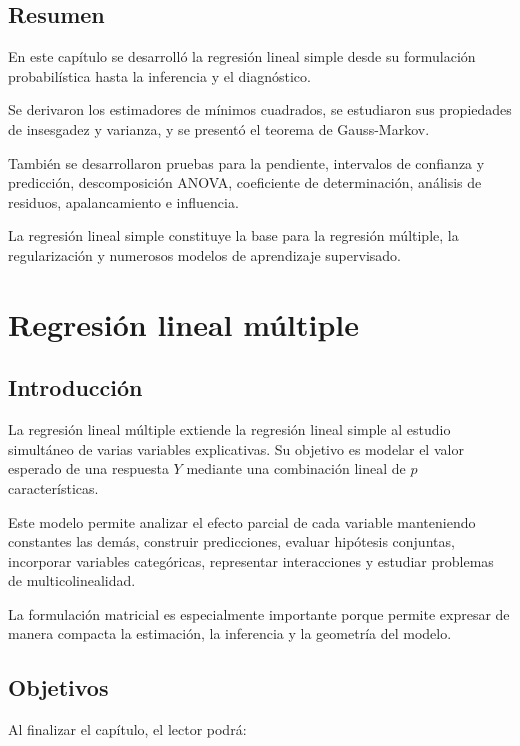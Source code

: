 \documentclass[
  spanish,
  11pt,
  letterpaper,
  DIV=11,
  numbers=noendperiod]{scrreprt}
\theoremstyle{definition}
\theoremstyle{plain}
\theoremstyle{definition}
\theoremstyle{remark}
\begin{document}
\section{Resumen}\label{resumen-8}

En este capítulo se desarrolló la regresión lineal simple desde su
formulación probabilística hasta la inferencia y el diagnóstico.

Se derivaron los estimadores de mínimos cuadrados, se estudiaron sus
propiedades de insesgadez y varianza, y se presentó el teorema de
Gauss-Markov.

También se desarrollaron pruebas para la pendiente, intervalos de
confianza y predicción, descomposición ANOVA, coeficiente de
determinación, análisis de residuos, apalancamiento e influencia.

La regresión lineal simple constituye la base para la regresión
múltiple, la regularización y numerosos modelos de aprendizaje
supervisado.

\chapter{Regresión lineal múltiple}\label{sec-regresion-lineal-multiple}

\section{Introducción}\label{introducciuxf3n-10}

La regresión lineal múltiple extiende la regresión lineal simple al
estudio simultáneo de varias variables explicativas. Su objetivo es
modelar el valor esperado de una respuesta \(Y\) mediante una
combinación lineal de \(p\) características.

Este modelo permite analizar el efecto parcial de cada variable
manteniendo constantes las demás, construir predicciones, evaluar
hipótesis conjuntas, incorporar variables categóricas, representar
interacciones y estudiar problemas de multicolinealidad.

La formulación matricial es especialmente importante porque permite
expresar de manera compacta la estimación, la inferencia y la geometría
del modelo.

\section{Objetivos}\label{objetivos-9}

Al finalizar el capítulo, el lector podrá:
\end{document}
